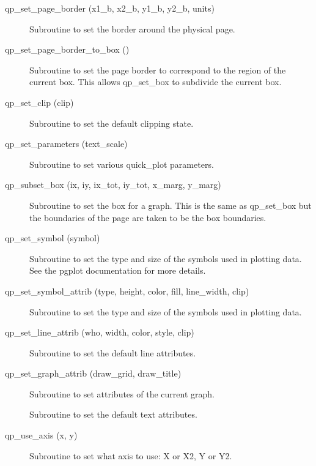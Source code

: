 \begin{description}
\item[qp_set_page_border (x1_b, x2_b, y1_b, y2_b, units)] \Newline 
     Subroutine to set the border around the physical page.

\item[qp_set_page_border_to_box ()] \Newline 
Subroutine to set the page border to correspond to the region of the
current box. This allows qp_set_box to subdivide the current box.

\item[qp_set_clip (clip)] \Newline 
     Subroutine to set the default clipping state.

\item[qp_set_parameters (text_scale)] \Newline 
Subroutine to set various quick_plot parameters.

\item[qp_subset_box (ix, iy, ix_tot, iy_tot, x_marg, y_marg)] \Newline 
     Subroutine to set the box for a graph. This is the same as
     qp_set_box but the boundaries of the page are taken to be the box boundaries.

\item[qp_set_symbol (symbol)] \Newline 
     Subroutine to set the type and size of the symbols used in plotting data.
     See the pgplot documentation for more details.

\item[qp_set_symbol_attrib (type, height, color, fill, line_width, clip)] \Newline 
     Subroutine to set the type and size of the symbols used in plotting data.

\item[qp_set_line_attrib (who, width, color, style, clip)] \Newline 
     Subroutine to set the default line attributes.

\item[qp_set_graph_attrib (draw_grid, draw_title)] \Newline 
     Subroutine to set attributes of the current graph.

\item[\protect\parbox{6in}{qp_set_text_attrib (who, height, color, \\
  \hspace*{2in} background, uniform_spacing, spacing_factor)} ] \Newline 
     Subroutine to set the default text attributes.

\item[qp_use_axis (x, y)] \Newline 
Subroutine to set what axis to use: X or X2, Y or Y2.

\end{description}

